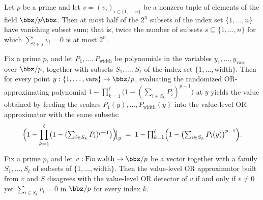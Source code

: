 \begin{lemma}
\label{RazborovSmolensky.subset_sum_zero_bound}
\leanok
{}
Let $p$ be a prime and let $v = (v_i)_{i \in \{1,\dots,n\}}$ be a nonzero tuple of
elements of the field $\bbz/p\bbz$. Then at most half of the $2^n$ subsets of the index
set $\{1,\dots,n\}$ have vanishing subset sum; that is, twice the number of subsets $s
\subseteq \{1,\dots,n\}$ for which $\sum_{i \in s} v_i = 0$ is at most $2^n$.
\end{lemma}

\begin{lemma}
\label{RazborovSmolensky.approxOr_eval_eq}
\leanok
{}
Fix a prime $p$, and let $P_1,\dots,P_{\mathrm{width}}$ be polynomials in the variables
$y_1,\dots,y_{\mathrm{vars}}$ over $\bbz/p$, together with subsets $S_1,\dots,S_\ell$ of
the index set $\{1,\dots,\mathrm{width}\}$. Then for every point $y :
\{1,\dots,\mathrm{vars}\} \to \bbz/p$, evaluating the randomized OR-approximating
polynomial $1 - \prod_{k=1}^{\ell}\bigl(1 - (\sum_{i \in S_k} P_i)^{p-1}\bigr)$ at $y$
yields the value obtained by feeding the scalars $P_1(y),\dots,P_{\mathrm{width}}(y)$
into the value-level OR approximator with the same subsets:
\[
\Bigl(1 - \prod_{k=1}^{\ell}\bigl(1 - (\textstyle\sum_{i \in S_k}
P_i)^{p-1}\bigr)\Bigr)\!\big|_{y}
\;=\;
1 - \prod_{k=1}^{\ell}\Bigl(1 - \bigl(\textstyle\sum_{i \in S_k}
P_i(y)\bigr)^{p-1}\Bigr).
\]
\end{lemma}

\begin{lemma}
\label{RazborovSmolensky.approxOr_failure_iff}
\leanok
{}
Fix a prime $p$, and let $v : \mathrm{Fin}\,\mathrm{width} \to \bbz/p$ be a vector
together with a family $S_1,\dots,S_\ell$ of subsets of $\{1,\dots,\mathrm{width}\}$.
Then the value-level OR approximator built from $v$ and $S$ disagrees with the
value-level OR detector of $v$ if and only if $v \neq 0$ yet $\sum_{i \in S_k} v_i = 0$
in $\bbz/p$ for every index $k$.
\end{lemma}

